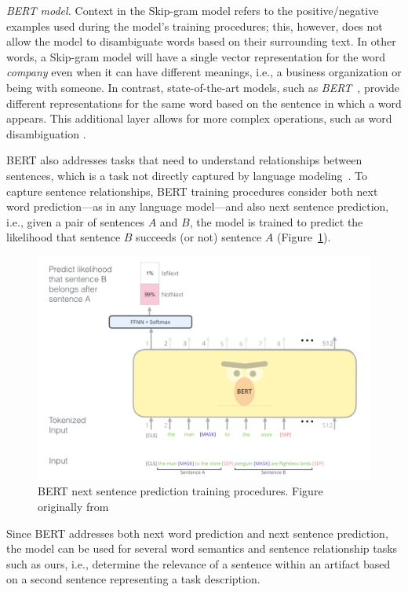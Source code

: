 \medskip
\begin{hangparas}{.0in}{0}
     \textit{BERT model.} Context in the Skip-gram model refers to the positive/negative examples used during the model's training procedures; this, however, does not allow the model to disambiguate words based on their surrounding text. In other words, a Skip-gram model will have a single vector representation for the word \textit{company} even when it can have different meanings, i.e., a business organization or being with someone. In contrast, state-of-the-art models, such as \textit{BERT}~\cite{Devlin2018Bert}, provide different representations for the same word based on the sentence in which a word appears.
    This additional layer allows for more complex operations, such as word disambiguation .
\end{hangparas}



BERT also addresses tasks that need to understand relationships between sentences, which is a task not directly captured by language modeling~\cite{Devlin2018Bert}.
To capture sentence relationships, BERT training procedures consider both next word prediction---as in any language model---and also next sentence prediction, i.e., given a pair of sentences $A$ and $B$, the model 
is trained to predict the likelihood that sentence $B$ succeeds (or not) sentence $A$ (Figure~\ref{fig:BERT}). 


\begin{figure}
    \centering
    \includegraphics[width=.75\linewidth]{fig/cp5/BERT}
    \caption{BERT next sentence prediction training procedures. Figure originally from~\cite{jay-alammar-bert}}
    \label{fig:BERT}
\end{figure}



Since BERT addresses both next word prediction and next sentence prediction, the model can be used for several
word semantics and sentence relationship tasks such as  ours, i.e., determine the relevance of a sentence within an artifact based on a second sentence representing a task description.


